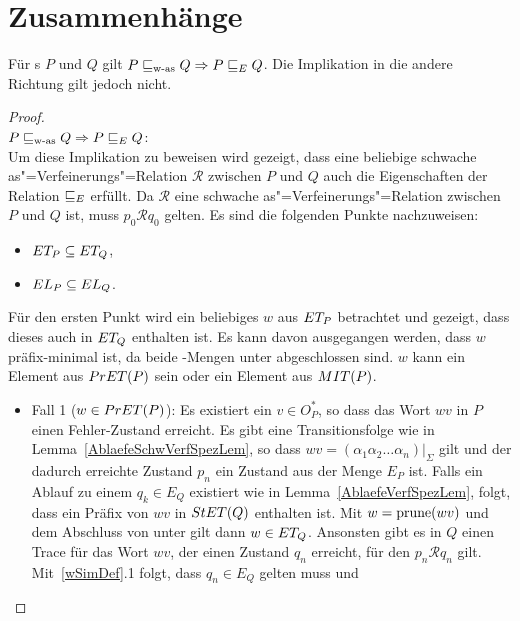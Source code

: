 \section{Zusammenhänge}

\begin{Satz}
  \label{ZusammenhFehlerSatz}
  Für \MEIO{}s $P$ und $Q$ gilt $P\sqsubseteq _{\mathrm{w}\text{-}\mathrm{as}} Q\Rightarrow P \sqsubseteq  _E Q$. Die
  Implikation in die andere Richtung gilt jedoch nicht.
\end{Satz}
\begin{proof}\mbox{}\\
  $P\sqsubseteq _{\mathrm{w}\text{-}\mathrm{as}} Q\Rightarrow P \sqsubseteq  _E Q$:\\
  Um diese Implikation zu beweisen wird gezeigt, dass eine beliebige
  schwache as"=Verfeinerungs"=Relation $\mathcal{R}$ zwischen $P$ und $Q$ auch
  die Eigenschaften der Relation $ \sqsubseteq  _E$ erfüllt. Da $\mathcal{R}$ eine
  schwache as"=Verfeinerungs"=Relation zwischen $P$ und $Q$ ist, muss $p_0
  \mathcal{R} q_0$ gelten. Es sind die folgenden Punkte nachzuweisen:
  \begin{itemize}
    \item $ET _P \subseteq ET _Q$,
    \item $EL _P \subseteq EL _Q$.
  \end{itemize}
  Für den ersten Punkt wird ein beliebiges $w$ aus $ET _P$ betrachtet und
  gezeigt, dass dieses auch in $ET _Q$ enthalten ist. Es kann davon
  ausgegangen werden, dass $w$ präfix-minimal ist, da beide \ET{}-Mengen unter
  \cont{} abgeschlossen sind. $w$ kann ein Element aus $PrET (P)$ sein oder
  ein Element aus $MIT (P)$.
  \begin{itemize}
    \item Fall 1 ($w\in PrET (P)$): Es existiert ein $v\in O_P^*$, so dass das
      Wort $wv$ in $P$ einen Fehler-Zustand erreicht. Es gibt eine
      Transitionsfolge wie in Lemma~\ref{AblaefeSchwVerfSpezLem}, so dass $wv =
      (\alpha _1\alpha _2\dots \alpha _n)|_{\Sigma}$ gilt und der dadurch
      erreichte Zustand $p_n$ ein Zustand aus der Menge $E_P$ ist. Falls ein
      Ablauf zu einem $q_k\in E_Q$ existiert wie in
      Lemma~\ref{AblaefeVerfSpezLem}, folgt, dass ein Präfix von $wv$ in $StET
      (Q)$ enthalten ist. Mit $w=\mathrm{prune} (wv)$ und dem Abschluss von \ET{} unter
      \cont{} gilt dann $w\in ET _Q$. Ansonsten gibt es in $Q$ einen Trace für
      das Wort $wv$, der einen Zustand $q_n$ erreicht, für den $p_n \mathcal{R}
      q_n$ gilt. Mit~\ref{wSimDef}.1 folgt, dass $q_n\in E_Q$ gelten muss und

\end{itemize}
\end{proof}
